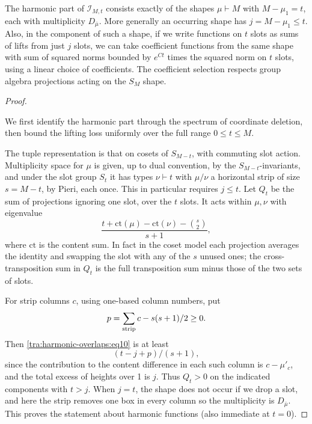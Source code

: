 \begin{lemma}\label{tra:harmonic-overlaps:lifting}

\label{tra:harmonic-overlaps:lifting-statement}
The harmonic part of \(\mathcal I_{M,t}\) consists exactly of the shapes \(\mu\vdash M\) with \(M-\mu_1=t\), each with multiplicity \(D_{\bar\mu}\). More generally an occurring shape has \(j=M-\mu_1\le t\). Also, in the component of such a shape, if we write functions on \(t\) slots as sums of lifts from just \(j\) slots, we can take coefficient functions from the same shape with sum of squared norms bounded by \(e^{C t}\) times the squared norm on \(t\) slots, using a linear choice of coefficients. The coefficient selection respects group algebra projections acting on the \(S_M\) shape.

\end{lemma}\begin{proof}\label{tra:harmonic-overlaps:lifting-proof}

\label{tra:harmonic-overlaps:deletion-spectrum}
We first identify the harmonic part through the spectrum of coordinate deletion, then bound the lifting loss uniformly over the full range \(0\le t\le M\).

The tuple representation is that on cosets of \(S_{M-t}\), with commuting slot action. Multiplicity space for \(\mu\) is given, up to dual convention, by the \(S_{M-t}\)-invariants, and under the slot group \(S_t\) it has types \(\nu\vdash t\) with \(\mu/\nu\) a horizontal strip of size \(s=M-t\), by Pieri, each once. This in particular requires \(j\le t\). Let \(Q_t\) be the sum of projections ignoring one slot, over the \(t\) slots. It acts within \(\mu,\nu\) with eigenvalue
\begin{equation}
                 \frac{t+\mathrm{ct}(\mu)-\mathrm{ct}(\nu)-\binom s2}
                      {s+1},                                             \label{tra:harmonic-overlaps:eq10}
\end{equation}
where \(\mathrm{ct}\) is the content sum. In fact in the coset model each projection averages the identity and swapping the slot with any of the \(s\) unused ones; the cross-transposition sum in \(Q_t\) is the full transposition sum minus those of the two sets of slots.

For strip columns \(c\), using one-based column numbers, put
\[
                             p=\sum_{\rm strip} c-s(s+1)/2\ge 0.
\]
Then \eqref{tra:harmonic-overlaps:eq10} is at least
\begin{equation}
                             (t-j+p)/(s+1),                              \label{tra:harmonic-overlaps:eq11}
\end{equation}
since the contribution to the content difference in each such column is \(c-\mu'_c\), and the total excess of heights over 1 is \(j\). Thus \(Q_t>0\) on the indicated components with \(t>j\). When \(j=t\), the shape does not occur if we drop a slot, and here the strip removes one box in every column so the multiplicity is \(D_{\bar\mu}\). This proves the statement about harmonic functions (also immediate at \(t=0\)).


\end{proof}

